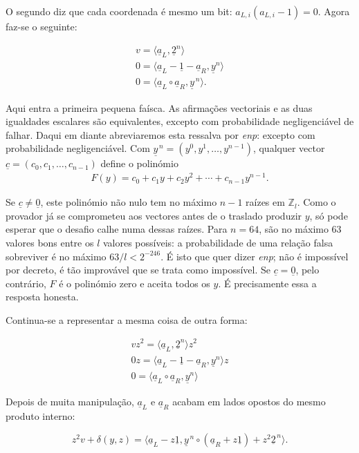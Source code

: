 O segundo diz que cada coordenada é mesmo um bit:
\(a_{L,i}(a_{L,i}-1)=0\).
Agora faz-se o seguinte:

\begin{align*}
v = \langle\underline{a}_L, \underline{2}^n\rangle\\
0 = \langle\underline{a}_L - \underline{1} - \underline{a}_R, \underline{y}^n\rangle\\
0 = \langle\underline{a}_L \circ \underline{a}_R, \underline{y}^{\,n}\rangle.
\end{align*}

Aqui entra a primeira pequena faísca. As afirmações vectoriais e as duas
igualdades escalares são equivalentes, excepto com probabilidade negligenciável
de falhar. Daqui em diante abreviaremos esta ressalva por \emph{enp}: excepto
com probabilidade negligenciável. Com
\(\underline{y}^{\,n}=(y^0,y^1,\ldots,y^{n-1})\), qualquer vector
\(\underline c=(c_0,c_1,\ldots,c_{n-1})\) define o polinómio
\begin{align*}
F(y)=c_0+c_1y+c_2y^2+\cdots+c_{n-1}y^{n-1}.
\end{align*}

Se \(\underline c\ne\underline0\), este polinómio não nulo tem no máximo
\(n-1\) raízes em \(\mathbb Z_l\). Como o provador já se comprometeu aos
vectores antes de o traslado produzir \(y\), só pode esperar que o desafio
calhe numa dessas raízes. Para \(n=64\), são no máximo 63 valores bons entre os
\(l\) valores possíveis: a probabilidade de uma relação falsa sobreviver é no
máximo \(63/l<2^{-246}\). É isto que quer dizer \emph{enp}; não é impossível
por decreto, é tão improvável que se trata como impossível. Se
\(\underline c=\underline0\), pelo contrário, \(F\) é o polinómio zero e
aceita todos os \(y\). É precisamente essa a resposta honesta.

Continua-se a representar a mesma coisa de outra forma:

\begin{align*}
vz^2 = \langle\underline{a}_L, \underline{2}^n\rangle z^2\\
0z = \langle\underline{a}_L - \underline{1} - \underline{a}_R, \underline{y}^n\rangle z\\
0 = \langle\underline{a}_L \circ \underline{a}_R, \underline{y}^n\rangle
\end{align*}

Depois de muita manipulação, \(\underline a_L\) e \(\underline a_R\) acabam em
lados opostos do mesmo produto interno:

\begin{equation}
z^2 v + \delta(y,z) = \langle\underline{a}_L - z\underline{1},
 \underline{y}^{\,n} \circ (\underline{a}_R + z\underline{1})
 + z^2 \underline{2}^{\,n}\rangle.
\label{eq:bp-t0-relation}
\end{equation}


